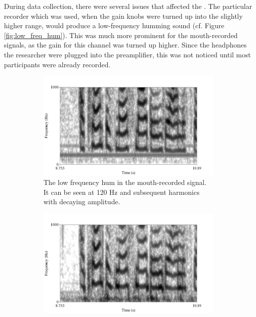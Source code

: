 During data collection, there were several issues that affected the \DIFdelbegin {}\DIFdelend \DIFaddbegin {}\DIFaddend .  
The particular recorder which was used, when the gain knobs were turned up into the slightly higher range, would produce a low-frequency humming sound (cf. Figure \ref{fig:low_freq_hum}).  This was much more prominent for the mouth-recorded signals, as the gain for this channel was turned up higher.  Since the headphones the researcher \DIFdelbegin {}\DIFdelend \DIFaddbegin {}\DIFaddend were plugged into the preamplifier, this was not noticed until most participants were already recorded.

\begin{figure}[h]
\centering
\begin{subfigure}{0.475\textwidth}
  \centering
  \includegraphics[width=1\linewidth]{figure/low_frequency_hum.png}
  \caption{The low frequency hum in the mouth-recorded signal.  It can be seen at 120 Hz and subsequent harmonics with decaying amplitude.}
  \label{fig:low_freq_hum-mouth}
\end{subfigure}%
\hfill
\begin{subfigure}{0.475\textwidth}
  \centering
  \includegraphics[width=1\linewidth]{figure/low_frequency_hum-ear.png}

\end{subfigure}
\end{figure}
